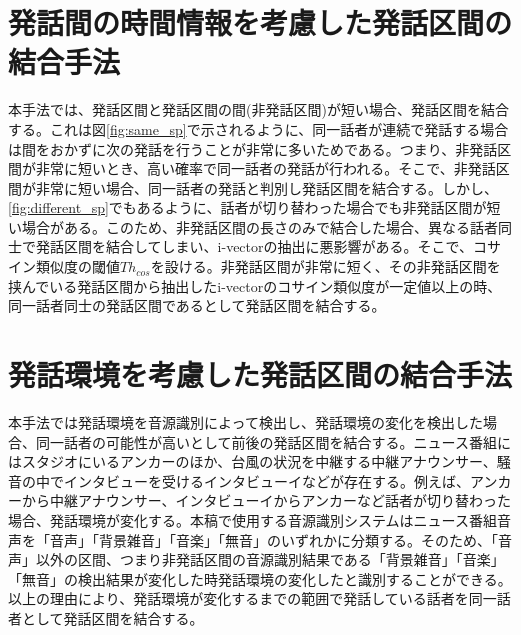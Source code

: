 \section{発話間の時間情報を考慮した発話区間の結合手法}
本手法では、発話区間と発話区間の間(非発話区間)が短い場合、発話区間を結合する。これは図\ref{fig:same_sp}で示されるように、同一話者が連続で発話する場合は間をおかずに次の発話を行うことが非常に多いためである。つまり、非発話区間が非常に短いとき、高い確率で同一話者の発話が行われる。そこで、非発話区間が非常に短い場合、同一話者の発話と判別し発話区間を結合する。しかし、\ref{fig:different_sp}でもあるように、話者が切り替わった場合でも非発話区間が短い場合がある。このため、非発話区間の長さのみで結合した場合、異なる話者同士で発話区間を結合してしまい、i-vectorの抽出に悪影響がある。そこで、コサイン類似度の閾値$Th_{cos}$を設ける。非発話区間が非常に短く、その非発話区間を挟んでいる発話区間から抽出したi-vectorのコサイン類似度が一定値以上の時、同一話者同士の発話区間であるとして発話区間を結合する。

\section{発話環境を考慮した発話区間の結合手法}
本手法では発話環境を音源識別によって検出し、発話環境の変化を検出した場合、同一話者の可能性が高いとして前後の発話区間を結合する。ニュース番組にはスタジオにいるアンカーのほか、台風の状況を中継する中継アナウンサー、騒音の中でインタビューを受けるインタビューイなどが存在する。例えば、アンカーから中継アナウンサー、インタビューイからアンカーなど話者が切り替わった場合、発話環境が変化する。本稿で使用する音源識別システムはニュース番組音声を「音声」「背景雑音」「音楽」「無音」のいずれかに分類する。そのため、「音声」以外の区間、つまり非発話区間の音源識別結果である「背景雑音」「音楽」「無音」の検出結果が変化した時発話環境の変化したと識別することができる。以上の理由により、発話環境が変化するまでの範囲で発話している話者を同一話者として発話区間を結合する。\par
